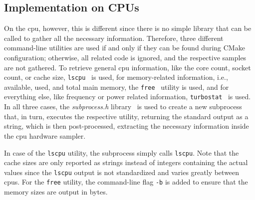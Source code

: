 \subsection{Implementation on CPUs}
\label{sec:hws_impl_cpus}

On the \gls{cpu}, however, this is different since there is no simple library that can be called to gather all the necessary information. 
Therefore, three different command-line utilities are used if and only if they can be found during CMake configuration; otherwise, all related code is ignored, and the respective samples are not gathered. 
To retrieve general \gls{cpu} information, like the core count, socket count, or cache size, \texttt{lscpu}~\cite{qian_lscpu_nodate} is used, for memory-related information, i.e., available, used, and total main memory, the \texttt{free}~\cite{small_free_nodate} utility is used, and for everything else, like frequency or power related information, \texttt{turbostat}~\cite{brown_turbostat_nodate} is used. 
In all three cases, the \textit{subprocess.h} library~\cite{henning_subprocessh_2024} is used to create a new subprocess that, in turn, executes the respective utility, returning the standard output as a string, which is then post-processed, extracting the necessary information inside the \gls{cpu} hardware sampler.  

In case of the \texttt{lscpu} utility, the subprocess simply calls \texttt{lscpu}. 
Note that the cache sizes are only reported as strings instead of integers containing the actual values since the \texttt{lscpu} output is not standardized and varies greatly between \glspl{cpu}. 
%
For the \texttt{free} utility, the command-line flag \texttt{-b} is added to ensure that the memory sizes are output in bytes. 

